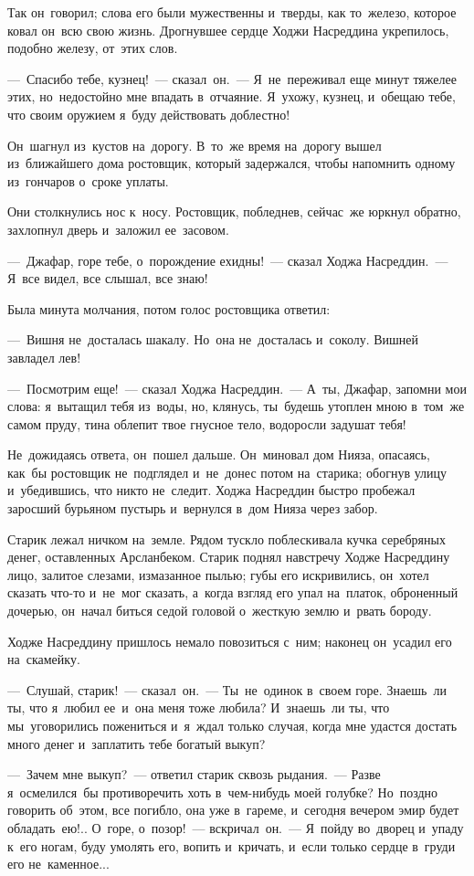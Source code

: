 \documentclass[12pt,a4paper]{book}
\begin{document}
Так он~говорил; слова его были мужественны и~тверды, как то~железо, которое ковал он~всю свою жизнь. Дрогнувшее сердце Ходжи Насреддина укрепилось, подобно железу, от~этих слов.

—~Спасибо тебе, кузнец!~— сказал~он.~— Я~не~переживал еще минут тяжелее этих, но~недостойно мне впадать в~отчаяние. Я~ухожу, кузнец, и~обещаю тебе, что своим оружием я~буду действовать доблестно!

Он~шагнул из~кустов на~дорогу. В~то~же время на~дорогу вышел из~ближайшего дома ростовщик, который задержался, чтобы напомнить одному из~гончаров о~сроке уплаты.

Они столкнулись нос к~носу. Ростовщик, побледнев, сейчас~же юркнул обратно, захлопнул дверь и~заложил ее~засовом.

—~Джафар, горе тебе, о~порождение ехидны!~— сказал Ходжа Насреддин.~— Я~все видел, все слышал, все знаю!

Была минута молчания, потом голос ростовщика ответил:

—~Вишня не~досталась шакалу. Но~она не~досталась и~соколу. Вишней завладел лев!

—~Посмотрим еще!~— сказал Ходжа Насреддин.~— А~ты, Джафар, запомни мои слова: я~вытащил тебя из~воды, но, клянусь, ты~будешь утоплен мною в~том~же самом пруду, тина облепит твое гнусное тело, водоросли задушат тебя!

Не~дожидаясь ответа, он~пошел дальше. Он~миновал дом Нияза, опасаясь, как~бы ростовщик не~подглядел и~не~донес потом на~старика; обогнув улицу и~убедившись, что никто не~следит. Ходжа Насреддин быстро пробежал заросший бурьяном пустырь и~вернулся в~дом Нияза через забор.

Старик лежал ничком на~земле. Рядом тускло поблескивала кучка серебряных денег, оставленных Арсланбеком. Старик поднял навстречу Ходже Насреддину лицо, залитое слезами, измазанное пылью; губы его искривились, он~хотел сказать что-то и~не~мог сказать, а~когда взгляд его упал на~платок, оброненный дочерью, он~начал биться седой головой о~жесткую землю и~рвать бороду.

Ходже Насреддину пришлось немало повозиться с~ним; наконец он~усадил его на~скамейку.

—~Слушай, старик!~— сказал~он.~— Ты~не~одинок в~своем горе. Знаешь~ли ты, что я~любил ее~и~она меня тоже любила? И~знаешь~ли ты, что мы~уговорились пожениться и~я~ждал только случая, когда мне удастся достать много денег и~заплатить тебе богатый выкуп?

—~Зачем мне выкуп?~— ответил старик сквозь рыдания.~— Разве я~осмелился~бы противоречить хоть в~чем-нибудь моей голубке? Но~поздно говорить об~этом, все погибло, она уже в~гареме, и~сегодня вечером эмир будет обладать~ею!.. О~горе, о~позор!~— вскричал~он.~— Я~пойду во~дворец и~упаду к~его ногам, буду умолять его, вопить и~кричать, и~если только сердце в~груди его не~каменное...
\end{document}
